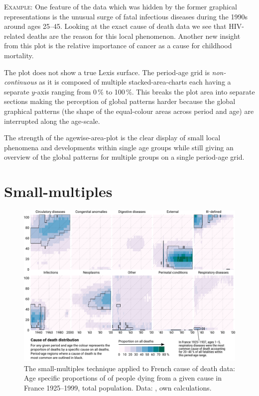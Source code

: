 \documentclass[parskip=half]{scrartcl}
\begin{document}
\textsc{Example:} One feature of the data which was hidden by the former graphical representations is the unusual surge of fatal infectious diseases during the 1990s around ages 25--45. Looking at the exact cause of death data we see that HIV-related deaths are the reason for this local phenomenon. Another new insight from this plot is the relative importance of cancer as a cause for childhood mortality.

The plot does not show a true Lexis surface. The period-age grid is \emph{non-continuous} as it is composed of multiple stacked-area-charts each having a separate $y$-axis ranging from 0\,\% to 100\,\%. This breaks the plot area into separate sections making the perception of global patterns harder because the global graphical patterns (the shape of the equal-colour areas across period and age) are interrupted along the age-scale.

The strength of the agewise-area-plot is the clear display of small local phenomena and developments within single age groups while still giving an overview of the global patterns for multiple groups on a single period-age grid.

\clearpage

\section{Small-multiples} %
\label{sec:sm}

\begin{figure}
  \centering
  \includegraphics[width = \linewidth]{./fig/small_multiples.pdf}
  \caption{The small-multiples technique applied to French cause of death data: Age specific proportions of of people dying from a given cause in France 1925--1999, total population. Data: \cite{Vallin2014}, own calculations.}
  \label{fig:smg}
\end{figure}
\end{document}
